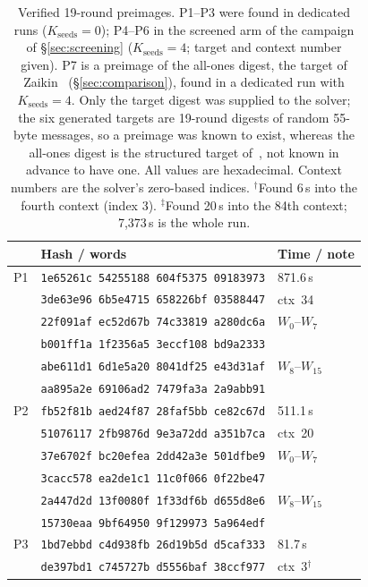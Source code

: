 \documentclass[11pt,a4paper]{article}
\begin{document}
\begin{table}[p]
\centering
\caption{Verified 19-round preimages.  P1--P3 were found in dedicated runs
($K_{\mathrm{seeds}}{=}0$); P4--P6 in the screened arm of the campaign of
\S\ref{sec:screening} ($K_{\mathrm{seeds}}{=}4$; target and context number
given).  P7 is a preimage of the all-ones digest, the target of
Zaikin~\cite{Zaikin2026} (\S\ref{sec:comparison}), found in a dedicated run
with $K_{\mathrm{seeds}}{=}4$.  Only the target digest was supplied to the solver; the six generated targets are 19-round digests of random 55-byte messages, so a preimage was known to exist, whereas the all-ones digest is the structured target of~\cite{Zaikin2026}, not known in advance to have one.  All values are hexadecimal.  Context numbers are the solver's zero-based indices.  $^\dagger$Found 6\,s into the fourth context (index 3).  $^\ddagger$Found 20\,s into the 84th context; 7{,}373\,s is the
whole run.}
\label{tab:preimages}
\footnotesize
\begin{tabular}{@{}lll@{}}
\toprule
 & \textbf{Hash / words} & \textbf{Time / note} \\
\midrule
P1 & \texttt{1e65261c 54255188 604f5375 09183973} & 871.6\,s \\
   & \texttt{3de63e96 6b5e4715 658226bf 03588447} & ctx~34 \\
   & \texttt{22f091af ec52d67b 74c33819 a280dc6a} & $W_0$--$W_7$ \\
   & \texttt{b001ff1a 1f2356a5 3eccf108 bd9a2333} & \\
   & \texttt{abe611d1 6d1e5a20 8041df25 e43d31af} & $W_8$--$W_{15}$ \\
   & \texttt{aa895a2e 69106ad2 7479fa3a 2a9abb91} & \\
\midrule
P2 & \texttt{fb52f81b aed24f87 28faf5bb ce82c67d} & 511.1\,s \\
   & \texttt{51076117 2fb9876d 9e3a72dd a351b7ca} & ctx~20 \\
   & \texttt{37e6702f bc20efea 2dd42a3e 501dfbe9} & $W_0$--$W_7$ \\
   & \texttt{3cacc578 ea2de1c1 11c0f066 0f22be47} & \\
   & \texttt{2a447d2d 13f0080f 1f33df6b d655d8e6} & $W_8$--$W_{15}$ \\
   & \texttt{15730eaa 9bf64950 9f129973 5a964edf} & \\
\midrule
P3 & \texttt{1bd7ebbd c4d938fb 26d19b5d d5caf333} & 81.7\,s \\
   & \texttt{de397bd1 c745727b d5556baf 38ccf977} & ctx~3$^\dagger$ \\

\end{tabular}
\end{table}
\end{document}

